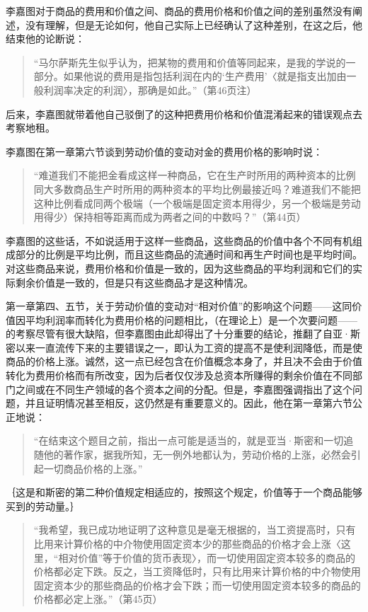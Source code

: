 李嘉图对于商品的费用和价值之间、商品的费用价格和价值之间的差别虽然没有阐述，没有理解，但是无论如何，他自己实际上已经确认了这种差别，在这之后，他结束他的论断说：

\begin{quote}{“马尔萨斯先生似乎认为，把某物的费用和价值等同起来，是我的学说的一部分。如果他说的费用是指包括利润在内的‘生产费用’〈就是指支出加由一般利润率决定的利润〉，那确是如此。”（第46页注）}\end{quote}

后来，李嘉图就带着他自己驳倒了的这种把费用价格和价值混淆起来的错误观点去考察地租。

李嘉图在第一章第六节谈到劳动价值的变动对金的费用价格的影响时说：

\begin{quote}{“难道我们不能把金看成这样一种商品，它在生产时所用的两种资本的比例同大多数商品生产时所用的两种资本的平均比例最接近吗？难道我们不能把这种比例看成同两个极端（一个极端是固定资本用得少，另一个极端是劳动用得少）保持相等距离而成为两者之间的中数吗？”（第44页）}\end{quote}

李嘉图的这些话，不如说适用于这样一些商品，这些商品的价值中各个不同有机组成部分的比例是平均比例，而且这些商品的流通时间和再生产时间也是平均时间。对这些商品来说，费用价格和价值是一致的，因为这些商品的平均利润和它们的实际剩余价值是一致的，但是只有这些商品才是这种情况。

第一章第四、五节，关于劳动价值的变动对“相对价值”的影响这个问题——这同价值因平均利润率而转化为费用价格的问题相比，（在理论上）是一个次要问题——的考察尽管有很大缺陷，但李嘉图由此却得出了十分重要的结论，推翻了自亚·斯密以来一直流传下来的主要错误之一，即认为工资的提高不是使利润降低，而是使商品的价格上涨。诚然，这一点已经包含在价值概念本身了，并且决不会由于价值转化为费用价格而有所改变，因为后者仅仅涉及总资本所赚得的剩余价值在不同部门之间或在不同生产领域的各个资本之间的分配。但是，李嘉图强调指出了这个问题，并且证明情况甚至相反，这仍然是有重要意义的。因此，他在第一章第六节公正地说：

\begin{quote}{“在结束这个题目之前，指出一点可能是适当的，就是亚当·斯密和一切追随他的著作家，据我所知，无一例外地都认为，劳动价格的上涨，必然会引起一切商品价格的上涨。”}\end{quote}

｛这是和斯密的第二种价值规定相适应的，按照这个规定，价值等于一个商品能够买到的劳动量。｝

\begin{quote}{“我希望，我已成功地证明了这种意见是毫无根据的，当工资提高时，只有比用来计算价格的中介物使用固定资本少的那些商品的价格才会上涨〈这里，“相对价值”等于价值的货币表现〉，而一切使用固定资本较多的商品的价格都必定下跌。反之，当工资降低时，只有比用来计算价格的中介物使用固定资本少的那些商品的价格才会下跌；而一切使用固定资本较多的商品的价格都必定上涨。”（第45页）}\end{quote}

